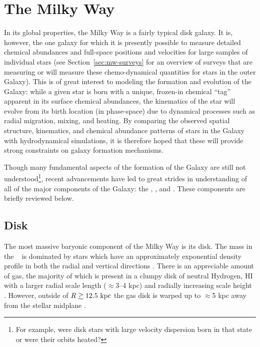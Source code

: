 \section{The Milky Way} \label{sec:milkyway}

In its global properties, the Milky Way is a fairly typical disk galaxy. It is,
however, the one galaxy for which it is presently possible to measure detailed
chemical abundances and full-space positions and velocities for large samples of
individual stars (see Section~\ref{sec:mw-surveys} for an overview of surveys
that are measuring or will measure these chemo-dynamical quantities for stars in
the outer Galaxy). This is of great interest to modeling the formation and
evolution of the Galaxy: while a given star is born with a unique, frozen-in
chemical ``tag'' apparent in its surface chemical abundances, the kinematics of
the star will evolve from its birth location (in phase-space) due to dynamical
processes such as radial migration, mixing, and heating. By comparing the
observed spatial structure, kinematics, and chemical abundance patterns of stars
in the Galaxy with hydrodynamical simulations, it is therefore hoped that these
will provide strong constraints on galaxy formation mechanisms.

Though many fundamental aspects of the formation of the Galaxy are still not
understood\footnote{For example, were disk stars with large velocity dispersion
born in that state or were their orbits heated?}, recent advancements have led
to great strides in understanding of all of the major components of the Galaxy:
the \mwdisk, \mwbulge, and \mwhalo. These components are briefly reviewed below.

\subsection{Disk}

The most massive baryonic component of the Milky Way is its disk. The mass in
the \mwdisk\ \citep[$M_d \approx 5 \times 10^{10}~\msun$;][]{mcmillan11} is
dominated by stars which have an approximately exponential density profile in
both the radial and vertical directions \citep[with scale lengths of $\approx$2
--3 kpc and $\approx$250--800 pc, respectively, from thin to thick
disk;][]{ojha01, juric08, mcmillan11, bovy12-spatialMAP}. There is an
appreciable amount of gas, the majority of which is present in a clumpy disk of
neutral Hydrogen, HI \citep[$M_{\rm HI} \approx 8 \times
10^9~\msun$;][]{kalberla09} with a larger radial scale length ($\approx$3--4
kpc) and radially increasing scale height \citep[$\approx$100 pc at $R=8~\kpc$
to $\approx$1 kpc at $R=25~\kpc$;][]{wouterloot90, merrifield92}. However,
outside of $R \gtrsim 12.5~\mathrm{kpc}$ the gas disk is warped up to $\approx$5 kpc
away from the stellar midplane \citep{henderson82, kalberla07}.


